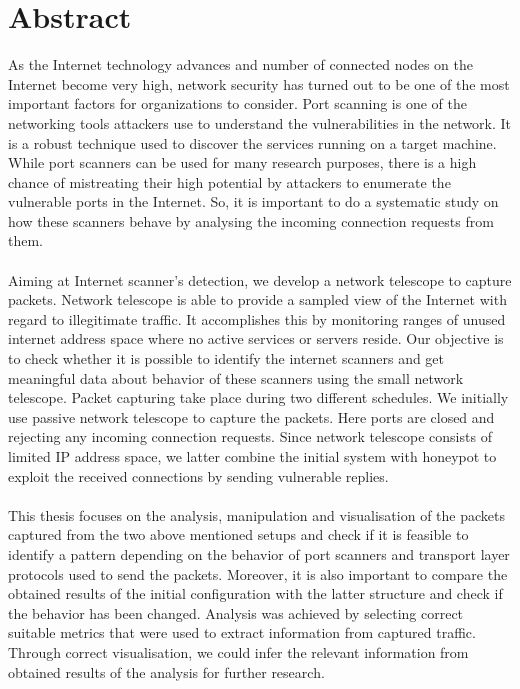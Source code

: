 \chapter*{Abstract}
\thispagestyle{empty}
As the Internet technology advances and number of connected nodes on the Internet
become very high, network security has turned out to be  one of the most important factors for organizations to consider.
Port scanning is one of the networking tools attackers use to understand the vulnerabilities in the network.
It is a robust technique used to discover the services running on a target machine.
While port scanners can be used for many research purposes, there is a high chance
of mistreating their high potential by attackers to enumerate the vulnerable ports in the
Internet. 
So, it is important to do a systematic study on how these scanners behave by analysing the incoming connection requests from them.\\\\
Aiming at Internet scanner's detection, we develop a network telescope to capture packets.
Network telescope is able to provide a sampled view of the Internet with regard to
illegitimate traffic.
It accomplishes this by monitoring ranges of unused internet address space where no active services or servers reside. 
Our objective is to check whether it is possible to identify the internet scanners and get meaningful data about behavior of these scanners using the small network telescope. 
Packet capturing take place during two different schedules.
We initially use passive network telescope to capture the packets.
Here ports are closed and rejecting any incoming connection requests.
Since network telescope consists of limited IP address space, we latter combine the initial system with honeypot to exploit the received connections by sending vulnerable replies.\\\\
This thesis focuses on the analysis, manipulation and visualisation of the packets captured from the two above mentioned setups and check if it is feasible to identify a pattern depending on the behavior of port scanners and transport layer protocols used to send the packets.
Moreover, it is also important to compare the obtained results of the initial configuration with the latter structure and check if the behavior has been changed.
Analysis was achieved by selecting correct suitable metrics that were used
to extract information from captured traffic. 
Through correct visualisation, we could infer the relevant information from obtained results of the analysis for further research. 

 
